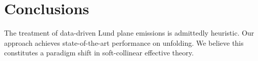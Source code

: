\section{Conclusions}\label{sec:conclusions}

The treatment of data-driven Lund plane emissions is admittedly
heuristic. Our approach achieves state-of-the-art performance on
unfolding. We believe this constitutes a paradigm shift in
soft-collinear effective theory.

